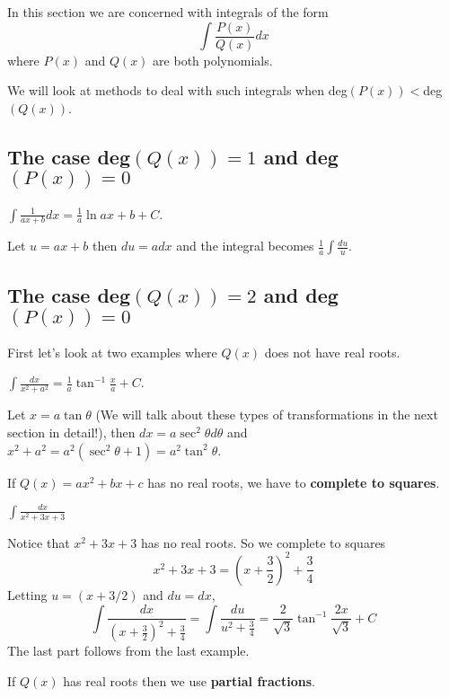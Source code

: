 \documentclass[../main.tex]{subfiles}
\begin{document}
In this section we are concerned with integrals of the form
\[
	\int \frac{P(x)}{Q(x)} dx
\]
where $P(x)$ and $Q(x)$ are both polynomials.

We will look at methods to deal with such integrals when deg$(P(x)) <$deg$(Q(x))$. 

\subsection*{The case deg$(Q(x)) = 1$ and deg$(P(x)) = 0$}
\begin{example}
	$\displaystyle \int \frac{1}{ax + b} dx = \frac{1}{a} \ln{ax+b} + C$.
\end{example}
\begin{solution}
	Let $u= ax+b$ then $du = adx$ and the integral becomes $\frac{1}{a}\int \frac{du}{u}$.
\end{solution}

\subsection*{The case deg$(Q(x)) = 2$ and deg$(P(x)) = 0$}
First let's look at two examples where $Q(x)$ does not have real roots.
\begin{example}
	$\displaystyle \int \frac{dx}{x^2+a^2} = \frac{1}{a} \tan^{-1} \frac{x}{a} + C$.
\end{example}
\begin{solution}
	Let $x=a\tan \theta$ (We will talk about these types of transformations in the next section in detail!), then $dx = a \sec^2 \theta d\theta$ and $x^2+a^2 = a^2(\sec^2\theta + 1) = a^2 \tan^2 \theta$.
\end{solution}

If $Q(x) = a x^2 + bx + c$ has no real roots, we have to \textbf{complete to squares}.
\begin{example}
	$ \displaystyle \int \frac{dx}{x^2 + 3x + 3}$
\end{example}
\begin{solution}
	Notice that $x^2 + 3x + 3$ has no real roots. So we complete to squares
	\[
		x^2 + 3x + 3 = (x + \frac{3}{2})^2 + \frac{3}{4}
	\]
	Letting $u = (x+3/2)$ and $du = dx$,
	\[
		\int \frac{dx}{(x + \frac{3}{2})^2 + \frac{3}{4}} = 
		\int \frac{du}{u^2 + \frac{3}{4}} = \frac{2}{\sqrt{3}} \tan^{-1} \frac{2x}{\sqrt{3}}  + C
	\]
	The last part follows from the last example.
\end{solution}

If $Q(x)$ has real roots then we use \textbf{partial fractions}.
\end{document}

